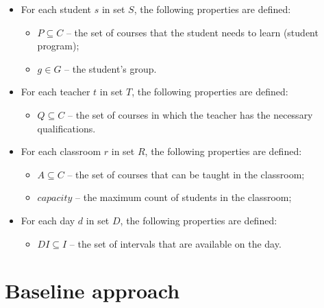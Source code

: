 \documentclass{article}
\begin{document}
\begin{itemize}
    \setlength\itemsep{0.05em}
    \item For each student $s$ in set $S$, the following properties are defined:
    \begin{itemize}
        \setlength\itemsep{0.05em}
        \item $P \subseteq C$ -- the set of courses that the student needs to learn (student program);
        \item $g \in G$ -- the student's group.
    \end{itemize}

    \item For each teacher $t$ in set $T$, the following properties are defined:
    \begin{itemize}
        \setlength\itemsep{0.05em}
        \item $Q \subseteq C$ -- the set of courses in which the teacher has the necessary qualifications.
    \end{itemize}
    
    \item For each classroom $r$ in set $R$, the following properties are defined:
    \begin{itemize}
        \setlength\itemsep{0.05em}
        \item $A \subseteq C$ -- the set of courses that can be taught in the classroom;
        \item $capacity$ -- the maximum count of students in the classroom;
    \end{itemize}

    \item For each day $d$ in set $D$, the following properties are defined:
    \begin{itemize}
        \setlength\itemsep{0.05em}
        \item $DI \subseteq I$ -- the set of intervals that are available on the day.
    \end{itemize}

\end{itemize}

\section{Baseline approach}





\end{document}
